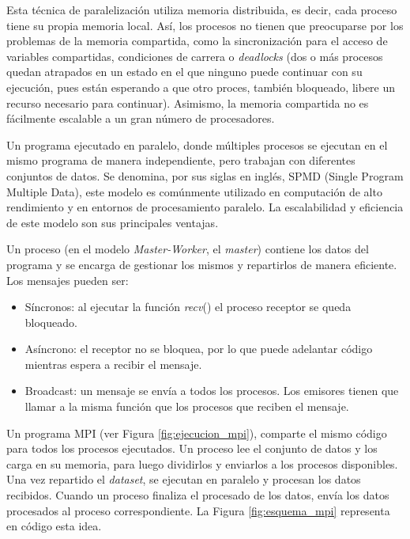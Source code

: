 	\newpage

	Esta técnica de paralelización utiliza memoria distribuida, es decir, cada proceso tiene su propia memoria local. Así, los procesos no tienen que preocuparse por los problemas de la memoria compartida, como la sincronización para el acceso de variables compartidas, condiciones de carrera o \textit{deadlocks} (dos o más procesos quedan atrapados en un estado en el que ninguno puede continuar con su ejecución, pues están esperando a que otro proces, también bloqueado, libere un recurso necesario para continuar). Asimismo, la memoria compartida no es fácilmente escalable a un gran número de procesadores\cite{jjruiz2016compartida}.


	Un programa ejecutado en paralelo, donde múltiples procesos se ejecutan en el mismo programa de manera independiente, pero trabajan con diferentes conjuntos de datos. Se denomina, por sus siglas en inglés, SPMD (Single Program Multiple Data), este modelo es comúnmente utilizado en computación de alto rendimiento y en entornos de procesamiento paralelo. La escalabilidad y eficiencia de este modelo son sus principales ventajas.

	Un proceso (en el modelo \textit{Master-Worker}, el \textit{master}) contiene los datos del programa y se encarga de gestionar los mismos y repartirlos de manera eficiente. Los mensajes pueden ser:
	\begin{itemize}
		\item Síncronos: al ejecutar la función \textit{recv}() el proceso receptor se queda bloqueado.
		\item Asíncrono: el receptor no se bloquea, por lo que puede adelantar código mientras espera a recibir el mensaje.
		\item Broadcast: un mensaje se envía a todos los procesos. Los emisores tienen que llamar a la misma función que los procesos que reciben el mensaje.
	\end{itemize}

	
	Un programa MPI (ver Figura \ref{fig:ejecucion_mpi}), comparte el mismo código para todos los procesos ejecutados. Un proceso lee el conjunto de datos y los carga en su memoria, para luego dividirlos y enviarlos a los procesos disponibles. Una vez repartido el \textit{dataset}, se ejecutan en paralelo y procesan los datos recibidos. Cuando un proceso finaliza el procesado de los datos, envía los datos procesados al proceso correspondiente. La Figura \ref{fig:esquema_mpi} representa en código esta idea.
	
	\vspace{-0.2cm}
	
